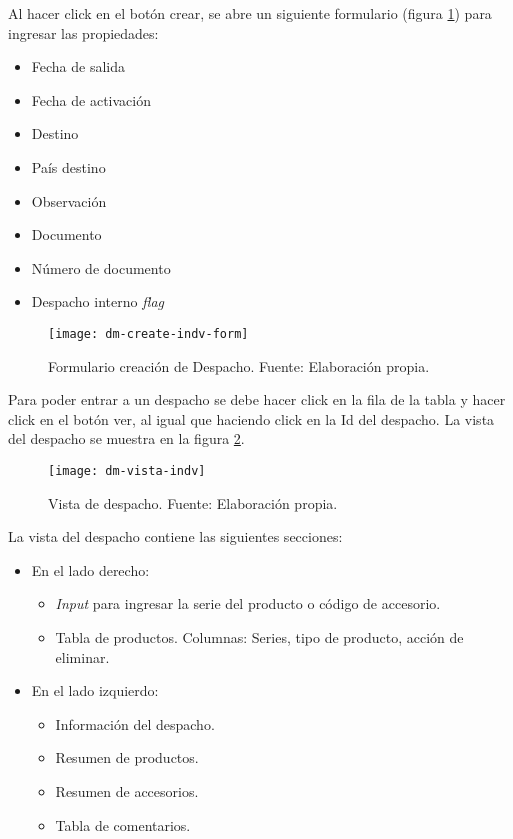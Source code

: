 Al hacer click en el botón crear, se abre un siguiente formulario (figura \ref{fig:dm-create-indv-form}) para ingresar las propiedades:
\begin{itemize}
    \item Fecha de salida
    \item Fecha de activación
    \item Destino
    \item País destino
    \item Observación
    \item Documento
    \item Número de documento
    \item Despacho interno \textit{flag}    
\end{itemize}

\begin{figure}[H]
	\centering
	\texttt{[image: dm-create-indv-form]}
	\caption{\label{fig:dm-create-indv-form} Formulario creación de Despacho. Fuente: Elaboración propia.}
\end{figure}

Para poder entrar a un despacho se debe hacer click en la fila de la tabla y hacer click en el botón ver, al igual que haciendo click en la Id del despacho.
La vista del despacho se muestra en la figura \ref{fig:dm-vista-indv}.

\begin{figure}[H]
	\centering
	\texttt{[image: dm-vista-indv]}
	\caption{\label{fig:dm-vista-indv} Vista de despacho. Fuente: Elaboración propia.}
\end{figure}

La vista del despacho contiene las siguientes secciones:
\begin{itemize}
    \item En el lado derecho:
    \begin{itemize}
        \item \textit{Input} para ingresar la serie del producto o código de accesorio.
        \item Tabla de productos. Columnas: Series, tipo de producto, acción de eliminar.
    \end{itemize}
    \item En el lado izquierdo:
    \begin{itemize}
        \item Información del despacho.
        \item Resumen de productos.
        \item Resumen de accesorios.
        \item Tabla de comentarios.
    \end{itemize}
\end{itemize}

